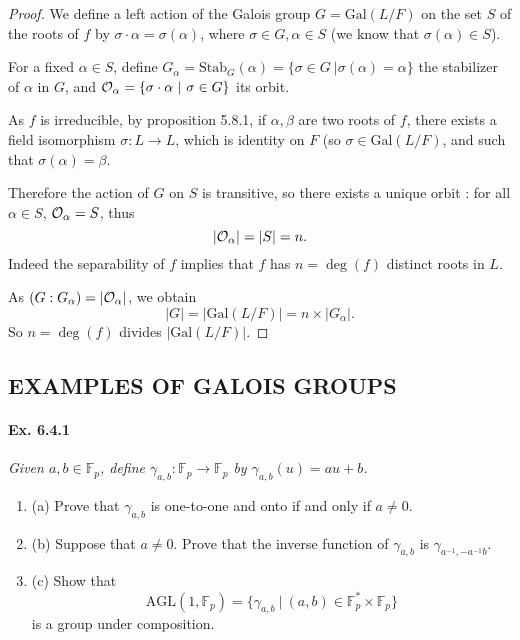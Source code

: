 \documentclass[11pt,a4paper]{article}
\newcommand{\be} {\begin{enumerate}}
\newcommand{\ee} {\end{enumerate}}
\newcommand{\F}{\mathbb{F}}
\newcommand{\Gal}{\mathrm{Gal}}
\begin{document}
\begin{proof}

We define a left action of the Galois group $G = \Gal(L/F)$ on the set $S$ of the roots of $f$ by $\sigma \cdot \alpha = \sigma(\alpha)$, where $\sigma \in G,  \alpha \in S$ (we know that $\sigma(\alpha) \in S$).

For a fixed $\alpha \in  S$, define $G_{\alpha}= \mathrm{Stab}_G(\alpha) = \{\sigma \in G \ \vert \sigma(\alpha) = \alpha\}$ the stabilizer of $\alpha$ in $G$, and ${\cal O}_\alpha = \{\sigma \cdot \alpha \ \vert \  \sigma \in G \}$ its orbit.

As $f$ is irreducible, by proposition 5.8.1, if $\alpha,\beta$ are two roots of $f$, there exists a field isomorphism $\sigma : L \to L$, which is identity on $F$ (so $\sigma \in \Gal(L/F)$,  and such that $\sigma(\alpha) = \beta$.

Therefore the action of $G$ on $S$ is transitive, so there exists a unique orbit : for all $\alpha \in S$, ${\cal O}_\alpha = S$, thus
$$|{\cal O}_\alpha| = |S| = n.$$
Indeed the separability of $f$ implies that $f$ has $n = \deg(f)$ distinct roots in $L$.

As $(G : G_\alpha) = |{\cal O}_\alpha|$, we obtain
$$|G | = |\Gal(L/F) | = n \times |G_\alpha|.$$
So $n = \deg(f)$ divides $ |\Gal(L/F) | $.
\end{proof}

\subsection{EXAMPLES OF GALOIS GROUPS}
\paragraph{Ex. 6.4.1}

{\it Given $a,b\in \F_p$, define $\gamma_{a,b}:\F_p \to \F_p$ by $\gamma_{a,b}(u) = au +b$.
\be
\item[(a)] Prove that $\gamma_{a,b}$ is one-to-one and onto if and only if $a\neq 0$.
\item[(b)] Suppose that $a\ne 0$. Prove that the inverse function of $\gamma_{a,b}$ is $\gamma_{a^{-1},-a^{-1}b}$.
\item[(c)] Show that
$$\mathrm{AGL}(1,\F_p) = \{\gamma_{a,b}\ \vert \ (a,b) \in \F_p^* \times \F_p\}$$
is a group under composition.
\ee
}
\end{document}
